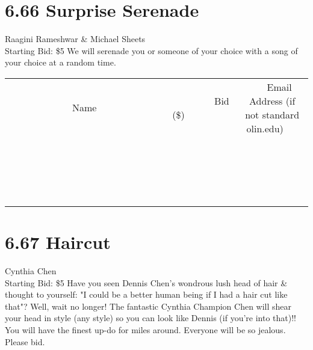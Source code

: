 \documentclass[11pt]{article}
\begin{document}
\section*{6.66 Surprise Serenade}
Raagini Rameshwar \& Michael Sheets
\\
Starting Bid: \$5
\newline
We will serenade you or someone of your choice with a song of your choice at a random time.
\\[3ex]
\begin{tabular}{c c c}
~~~~~~~~~~~~~Name~~~~~~~~~~~~~ & ~~~~~~~~~Bid (\$)~~~~~~~~~  & ~~~Email Address (if not standard olin.edu)~~~\\
 & & \\
\hline
 & & \\
\hline
 & & \\
\hline
 & & \\
\hline
 & & \\
\hline
 & & \\
\hline
 & & \\
\hline
 & & \\
\hline
 & & \\
\hline
 & & \\
\hline
 & & \\
\hline
 & & \\
\hline
 & & \\
\hline
 & & \\
\hline
 & & \\
\hline
 & & \\
\hline
 & & \\
\hline
 & & \\
\hline
 & & \\
\hline
\end{tabular}
\newpage
\section*{6.67 Haircut}
Cynthia Chen
\\
Starting Bid: \$5
\newline
Have you seen Dennis Chen's wondrous lush head of hair \& thought to yourself: "I could be a better human being if I had a hair cut like that"? Well, wait no longer! The fantastic Cynthia Champion Chen will shear your head in style (any style) so you can look like Dennis (if you're into that)!! You will have the finest up-do for miles around. Everyone will be so jealous. Please bid.
\end{document}
